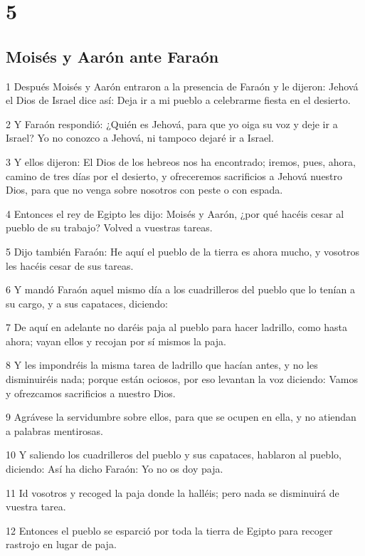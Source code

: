 \chapter{5}

\section*{Moisés y Aarón ante Faraón}

\par 1 Después Moisés y Aarón entraron a la presencia de Faraón y le dijeron: Jehová el Dios de Israel dice así: Deja ir a mi pueblo a celebrarme fiesta en el desierto.
\par 2 Y Faraón respondió: ¿Quién es Jehová, para que yo oiga su voz y deje ir a Israel? Yo no conozco a Jehová, ni tampoco dejaré ir a Israel.
\par 3 Y ellos dijeron: El Dios de los hebreos nos ha encontrado; iremos, pues, ahora, camino de tres días por el desierto, y ofreceremos sacrificios a Jehová nuestro Dios, para que no venga sobre nosotros con peste o con espada.
\par 4 Entonces el rey de Egipto les dijo: Moisés y Aarón, ¿por qué hacéis cesar al pueblo de su trabajo? Volved a vuestras tareas.
\par 5 Dijo también Faraón: He aquí el pueblo de la tierra es ahora mucho, y vosotros les hacéis cesar de sus tareas.
\par 6 Y mandó Faraón aquel mismo día a los cuadrilleros del pueblo que lo tenían a su cargo, y a sus capataces, diciendo:
\par 7 De aquí en adelante no daréis paja al pueblo para hacer ladrillo, como hasta ahora; vayan ellos y recojan por sí mismos la paja.
\par 8 Y les impondréis la misma tarea de ladrillo que hacían antes, y no les disminuiréis nada; porque están ociosos, por eso levantan la voz diciendo: Vamos y ofrezcamos sacrificios a nuestro Dios.
\par 9 Agrávese la servidumbre sobre ellos, para que se ocupen en ella, y no atiendan a palabras mentirosas.
\par 10 Y saliendo los cuadrilleros del pueblo y sus capataces, hablaron al pueblo, diciendo: Así ha dicho Faraón: Yo no os doy paja.
\par 11 Id vosotros y recoged la paja donde la halléis; pero nada se disminuirá de vuestra tarea.
\par 12 Entonces el pueblo se esparció por toda la tierra de Egipto para recoger rastrojo en lugar de paja.
